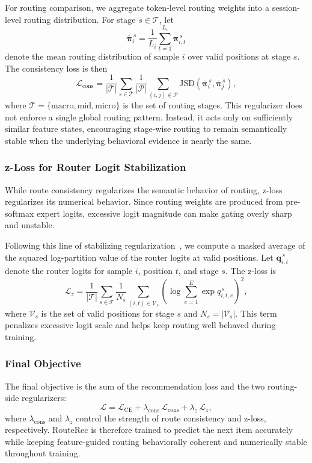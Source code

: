 \documentclass[sigconf,anonymous,review]{acmart}
\begin{document}
For routing comparison, we aggregate token-level routing weights into a session-level routing distribution. For stage $s \in \mathcal{T}$, let
\[
\bar{\boldsymbol{\pi}}_i^{\,s}
=
\frac{1}{L_i}\sum_{t=1}^{L_i}\boldsymbol{\pi}_{i,t}^{\,s}
\]
denote the mean routing distribution of sample $i$ over valid positions at stage $s$. The consistency loss is then
\[
\mathcal{L}_{\mathrm{cons}}
=
\frac{1}{|\mathcal{T}|}
\sum_{s \in \mathcal{T}}
\frac{1}{|\mathcal{P}|}
\sum_{(i,j)\in \mathcal{P}}
\mathrm{JSD}\!\left(\bar{\boldsymbol{\pi}}_i^{\,s}, \bar{\boldsymbol{\pi}}_j^{\,s}\right),
\]
where $\mathcal{T}=\{\mathrm{macro},\mathrm{mid},\mathrm{micro}\}$ is the set of routing stages. This regularizer does not enforce a single global routing pattern. Instead, it acts only on sufficiently similar feature states, encouraging stage-wise routing to remain semantically stable when the underlying behavioral evidence is nearly the same.

\subsubsection{z-Loss for Router Logit Stabilization}

While route consistency regularizes the semantic behavior of routing, z-loss regularizes its numerical behavior. Since routing weights are produced from pre-softmax expert logits, excessive logit magnitude can make gating overly sharp and unstable.

Following this line of stabilizing regularization~\cite{zoph2022stmoe}, we compute a masked average of the squared log-partition value of the router logits at valid positions. Let $\mathbf{q}_{i,t}^{\,s}$ denote the router logits for sample $i$, position $t$, and stage $s$. The z-loss is
\[
\mathcal{L}_{z}
=
\frac{1}{|\mathcal{T}|}
\sum_{s \in \mathcal{T}}
\frac{1}{N_s}
\sum_{(i,t)\in\mathcal{V}_s}
\left(
\log \sum_{e=1}^{E}\exp q_{i,t,e}^{\,s}
\right)^2,
\]
where $\mathcal{V}_s$ is the set of valid positions for stage $s$ and $N_s = |\mathcal{V}_s|$. This term penalizes excessive logit scale and helps keep routing well behaved during training.

\subsubsection{Final Objective}

The final objective is the sum of the recommendation loss and the two routing-side regularizers:
\[
\mathcal{L}
=
\mathcal{L}_{\mathrm{CE}}
+
\lambda_{\mathrm{cons}}\,\mathcal{L}_{\mathrm{cons}}
+
\lambda_{z}\,\mathcal{L}_{z},
\]
where $\lambda_{\mathrm{cons}}$ and $\lambda_z$ control the strength of route consistency and z-loss, respectively. RouteRec is therefore trained to predict the next item accurately while keeping feature-guided routing behaviorally coherent and numerically stable throughout training.
\end{document}
